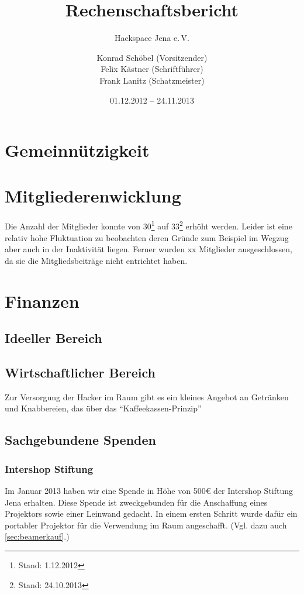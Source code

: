 \documentclass[10pt,DIV16]{scrartcl}
\title{Rechenschaftsbericht}
\subtitle{Hackspace Jena e.\,V.}
\author{%
	Konrad Schöbel (Vorsitzender)\\
    Felix Kästner (Schriftführer)\\
	Frank Lanitz (Schatzmeister)
}
\date{01.12.2012 -- 24.11.2013}
\begin{document}
\maketitle{}

\tableofcontents{}

\newpage{}

\section{Gemeinnützigkeit}

\section{Mitgliederenwicklung}

Die Anzahl der Mitglieder konnte von 30\footnote{Stand: 1.12.2012} auf
33\footnote{Stand: 24.10.2013} erhöht werden. Leider ist eine relativ
hohe Fluktuation zu beobachten deren Gründe zum Beispiel im Wegzug aber
auch in der Inaktivität liegen. Ferner wurden xx Mitglieder
ausgeschlossen, da sie die Mitgliedsbeiträge nicht entrichtet haben.

\section{Finanzen}

\subsection{Ideeller Bereich}

\subsection{Wirtschaftlicher Bereich}

Zur Versorgung der Hacker im Raum gibt es ein kleines Angebot an
Getränken und Knabbereien, das über das "`Kaffeekassen-Prinzip"'

\subsection{Sachgebundene Spenden}
\subsubsection{Intershop Stiftung}
\label{sec:iss-spende}
Im Januar 2013 haben wir eine Spende in Höhe von 500\euro{} der Intershop
Stiftung Jena erhalten. Diese Spende ist zweckgebunden für die
Anschaffung eines Projektors sowie einer Leinwand gedacht. In einem
ersten Schritt wurde dafür ein portabler Projektor für die Verwendung
im Raum angeschafft. (Vgl. dazu auch \ref{sec:beamerkauf}.)
\end{document}
